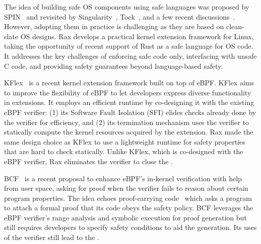  The idea of building safe OS components using
    safe languages was proposed by SPIN~\cite{spin}
    and revisited by Singularity~\cite{singularity}, Tock~\cite{tockos}, and a few recent
    discussions~\cite{Miller-hotos19,untenableVerification,Burtsev-hotos23}.
However, adopting them in practice is challenging as they are based on
    clean-slate OS designs.
Rax develops a practical kernel extension framework for Linux, taking the
    opportunity of recent support of Rust as a safe language for OS code.
It addresses the key challenges of enforcing safe code only, interfacing
    with unsafe C code, and providing safety guarantees beyond language-based safety.

KFlex~\cite{dwivedi-sosp24} is a recent kernel extension framework built on top of eBPF.
KFlex aims to improve the flexibility of eBPF to let developers express diverse functionality in extensions.
It employs an efficient runtime by co-designing it with the existing eBPF verifier: (1) its Software Fault Isolation (SFI)
    elides checks already done by the verifier for efficiency,
    and (2) its termination mechanism uses the verifier to
    statically compute the kernel resources acquired by the extension.
Rax made the same design choice as KFlex to use a lightweight runtime for safety properties that are hard to
    check statically.
Unlike KFlex, which is co-designed with the eBPF verifier,
    Rax eliminates the verifier to close the \gap{}.

BCF~\cite{lpc-24-bcf-lazy-abstraction-proof} is a recent proposal to enhance eBPF's in-kernel verification
    with help from user space, asking for proof when the
    verifier fails to reason about certain program properties.
The idea echoes proof-carrying code~\cite{necula-pcc} which asks a program to attach a formal proof
    that its code obeys the safety policy.
BCF leverages the eBPF verifier's range analysis and symbolic execution for proof
    generation but still requires developers to specify safety conditions to aid the generation.
Its uses of the verifier still lead to the \gap{}.


